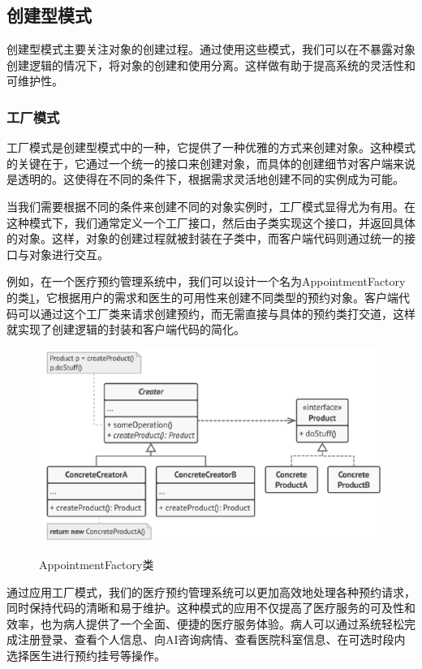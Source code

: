 \subsection{创建型模式}
创建型模式主要关注对象的创建过程。通过使用这些模式，我们可以在不暴露对象创建逻辑的情况下，将对象的创建和使用分离。这样做有助于提高系统的灵活性和可维护性。

\subsubsection{工厂模式}

工厂模式是创建型模式中的一种，它提供了一种优雅的方式来创建对象。这种模式的关键在于，它通过一个统一的接口来创建对象，而具体的创建细节对客户端来说是透明的。这使得在不同的条件下，根据需求灵活地创建不同的实例成为可能。

当我们需要根据不同的条件来创建不同的对象实例时，工厂模式显得尤为有用。在这种模式下，我们通常定义一个工厂接口，然后由子类实现这个接口，并返回具体的对象。这样，对象的创建过程就被封装在子类中，而客户端代码则通过统一的接口与对象进行交互。

例如，在一个医疗预约管理系统中，我们可以设计一个名为AppointmentFactory的类\ref{app01}，它根据用户的需求和医生的可用性来创建不同类型的预约对象。客户端代码可以通过这个工厂类来请求创建预约，而无需直接与具体的预约类打交道，这样就实现了创建逻辑的封装和客户端代码的简化。

\begin{figure}[htbp]
	\centering
	\includegraphics[width=0.6\textheight]{figures/01.png}\label{app01}
	\caption{AppointmentFactory类}
\end{figure}

通过应用工厂模式，我们的医疗预约管理系统可以更加高效地处理各种预约请求，同时保持代码的清晰和易于维护。这种模式的应用不仅提高了医疗服务的可及性和效率，也为病人提供了一个全面、便捷的医疗服务体验。病人可以通过系统轻松完成注册登录、查看个人信息、向AI咨询病情、查看医院科室信息、在可选时段内选择医生进行预约挂号等操作。

